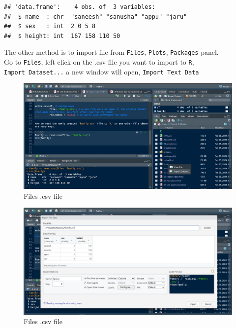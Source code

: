 \documentclass[
]{book}
\begin{document}
\begin{verbatim}
## 'data.frame':    4 obs. of  3 variables:
##  $ name  : chr  "saneesh" "sanusha" "appu" "jaru"
##  $ sex   : int  2 0 5 8
##  $ height: int  167 158 110 50
\end{verbatim}

The other method is to import file from \texttt{Files}, \texttt{Plots}, \texttt{Packages} panel.\\
Go to \texttt{Files}, left click on the .csv file you want to import to \texttt{R}, \texttt{Import\ Dataset...} a new window will open, \texttt{Import\ Text\ Data}

\begin{figure}

{\centering \includegraphics[width=1\linewidth]{pictures/importcsv} 

}

\caption{Files .csv file}\label{fig:unnamed-chunk-46}
\end{figure}

\begin{figure}

{\centering \includegraphics[width=1\linewidth]{pictures/importcsv_1} 

}

\caption{Files .csv file}\label{fig:unnamed-chunk-47}
\end{figure}
\end{document}
